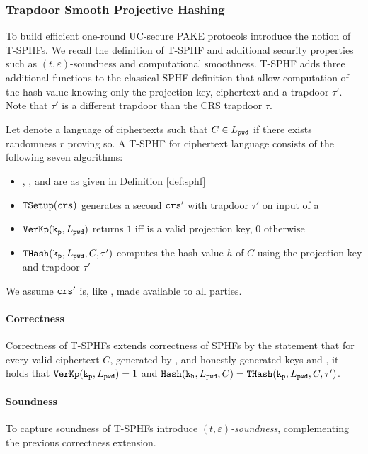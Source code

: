 \subsubsection{Trapdoor Smooth Projective Hashing}\label{sec:tsphf}
To build efficient one-round UC-secure PAKE protocols \citet{Benhamouda2013} introduce the notion of \acp{T-SPHF}.
We recall the definition of \ac{T-SPHF} and additional security properties such as $(t,\varepsilon)$-soundness and computational smoothness.
\ac{T-SPHF} adds three additional functions to the classical \ac{SPHF} definition that allow computation of the hash value knowing only the projection key, ciphertext and a trapdoor $\tau'$.
Note that $\tau'$ is a different trapdoor than the \ac{CRS} trapdoor $\tau$.

\begin{definition}\label{def:tsphf}
Let \Lpwd denote a language of ciphertexts such that $C\in L_\mathtt{pwd}$ if there exists randomness $r$ proving so.
A \acl{T-SPHF} for ciphertext language \Lpwd consists of the following seven algorithms:

\begin{itemize}
  \item \HKGen, \PKGen, \Hash and \PHash are as given in Definition \ref{def:sphf}
	\item $\mathtt{TSetup}(\mathtt{crs})$ generates a second $\mathtt{crs}'$ with trapdoor $\tau'$ on input of a \crs
	\item $\mathtt{VerKp}(\mathtt{k_p}, L_\mathtt{pwd})$ returns $1$ iff \hp is a valid projection key, $0$ otherwise
	\item $\mathtt{THash}(\mathtt{k_p}, L_\mathtt{pwd}, C, \tau')$ computes the hash value $h$ of $C$ using the projection key \hp and trapdoor $\tau'$
\end{itemize}

\noindent
We assume $\mathtt{crs}'$ is, like \crs, made available to all parties.
\end{definition}

\paragraph{Correctness} Correctness of \acp{T-SPHF} extends correctness of \acp{SPHF} by the statement that for every valid ciphertext $C$, generated by \cL, and honestly generated keys \hk and \hp, it holds that $\mathtt{VerKp}(\mathtt{k_p}, L_\mathtt{pwd})=1$ and $\mathtt{Hash}(\mathtt{k_h}, L_\mathtt{pwd}, C)=\mathtt{THash}(\mathtt{k_p}, L_\mathtt{pwd}, C, \tau')$.

\paragraph{Soundness}
To capture soundness of \acp{T-SPHF} \citet{Benhamouda2013} introduce \emph{$(t,\varepsilon)$-soundness}, complementing the previous correctness extension.

